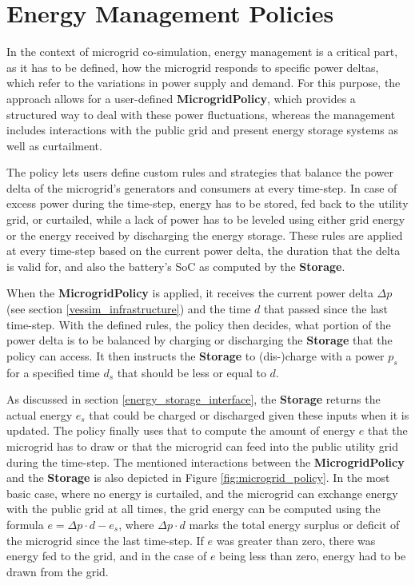 \section{Energy Management Policies}
\label{energy_management_policies}
In the context of microgrid co-simulation, energy management is a critical part, as it has to be defined, how the microgrid responds to specific power deltas, which refer to the variations in power supply and demand. For this purpose, the approach allows for a user-defined \textbf{MicrogridPolicy}, which provides a structured way to deal with these power fluctuations, whereas the management includes interactions with the public grid and present energy storage systems as well as curtailment.

The policy lets users define custom rules and strategies that balance the power delta of the microgrid's generators and consumers at every time-step. In case of excess power during the time-step, energy has to be stored, fed back to the utility grid, or curtailed, while a lack of power has to be leveled using either grid energy or the energy received by discharging the energy storage. These rules are applied at every time-step based on the current power delta, the duration that the delta is valid for, and also the battery's SoC as computed by the \textbf{Storage}.

When the \textbf{MicrogridPolicy} is applied, it receives the current power delta $\Delta p$ (see section \ref{vessim_infrastructure}) and the time $d$ that passed since the last time-step. With the defined rules, the policy then decides, what portion of the power delta is to be balanced by charging or discharging the \textbf{Storage} that the policy can access. It then instructs the \textbf{Storage} to (dis-)charge with a power $p_s$ for a specified time $d_s$ that should be less or equal to $d$.

As discussed in section \ref{energy_storage_interface}, the \textbf{Storage} returns the actual energy $e_s$ that could be charged or discharged given these inputs when it is updated. The policy finally uses that to compute the amount of energy $e$ that the microgrid has to draw or that the microgrid can feed into the public utility grid during the time-step. The mentioned interactions between the \textbf{MicrogridPolicy} and the \textbf{Storage} is also depicted in Figure \ref{fig:microgrid_policy}. In the most basic case, where no energy is curtailed, and the microgrid can exchange energy with the public grid at all times, the grid energy can be computed using the formula $e = \Delta p \cdot d - e_s$, where $\Delta p \cdot d$ marks the total energy surplus or deficit of the microgrid since the last time-step. If $e$ was greater than zero, there was energy fed to the grid, and in the case of $e$ being less than zero, energy had to be drawn from the grid.

